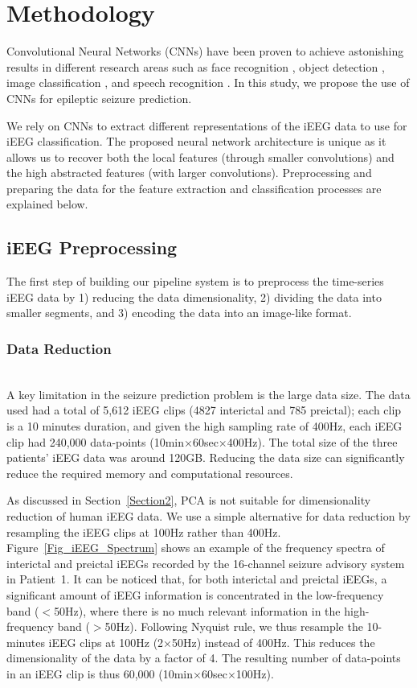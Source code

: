 \documentclass[journal]{IEEEtran}
\begin{document}
\section{Methodology}
\label{Section3}

Convolutional Neural Networks (CNNs) have been proven to achieve astonishing results in different research areas such as face recognition \cite{Taigman}, object detection \cite{Erhan_2014_CVPR}, image classification \cite{Krizhevsky}, and speech recognition \cite{Graves}. In this study, we propose the use of CNNs for epileptic seizure prediction. 

We rely on CNNs to extract different representations of the iEEG data to use for iEEG classification. The proposed neural network architecture is unique as it allows us to recover both the local features (through smaller convolutions) and the high abstracted features (with larger convolutions). Preprocessing and preparing the data for the feature extraction and classification processes are explained below.

\subsection{iEEG Preprocessing}

The first step of building our pipeline system is to preprocess the time-series iEEG data by 1) reducing the data dimensionality, 2) dividing the data into smaller segments, and 3) encoding the data into an image-like format.

\subsubsection{Data Reduction} ~\\  
A key limitation in the seizure prediction problem is the large data size. The data used had a total of 5,612 iEEG clips (4827 interictal and 785 preictal); each clip is a 10 minutes duration, and given the high sampling rate of 400Hz, each iEEG clip had 240,000 data-points (10min$\times$60sec$\times$400Hz). The total size of the three patients' iEEG data was around 120GB. Reducing the data size can significantly reduce the required memory and computational resources.  

As discussed in Section~\ref{Section2}, PCA is not suitable for dimensionality reduction of human iEEG data. We use a simple alternative for data reduction by resampling the iEEG clips at 100Hz rather than 400Hz. Figure~\ref{Fig_iEEG_Spectrum} shows an example of the frequency spectra of interictal and preictal iEEGs recorded by the 16-channel seizure advisory system in Patient~1. It can be noticed that, for both interictal and preictal iEEGs, a significant amount of iEEG information is concentrated in the low-frequency band ($<$50Hz), where there is no much relevant information in the high-frequency band ($>$50Hz). Following Nyquist rule, we thus resample the 10-minutes iEEG clips at 100Hz (2$\times$50Hz) instead of 400Hz. This reduces the dimensionality of the data by a factor of 4. The resulting number of data-points in an iEEG clip is thus 60,000 (10min$\times$60sec$\times$100Hz).
\end{document}
